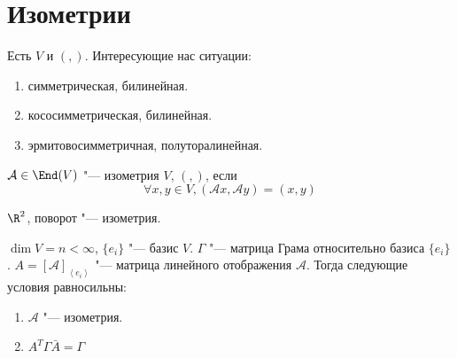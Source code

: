 \section{Изометрии}
Есть $V$ и $(,)$.
Интересующие нас ситуации:
\begin{enumerate}
    \item симметрическая, билинейная.
    \item кососимметрическая, билинейная.
    \item эрмитовосимметричная, полуторалинейная.
\end{enumerate}

\begin{Def}
	$\mathcal A \in \End(V)$ "--- изометрия $V$, $(,)$, если
	\[ \forall x, y \in V, (\mathcal A x, \mathcal A y) = (x, y) \]
\end{Def}

\begin{exmp}
	$\R^2$, поворот "--- изометрия.
\end{exmp}

\begin{theorem}
	$\dim V = n < \infty$, $\{e_i\} $ "--- базис $V$.
	$\Gamma$ "--- матрица Грама относительно базиса $\{e_i\}$.
	$A = [\mathcal A]_{\left<e_i\right>}$ "--- матрица линейного отображения $\mathcal A$.
	Тогда следующие условия равносильны:
	\begin{enumerate}
		\item $\mathcal A $ "--- изометрия.
		\item $A^T \Gamma \bar A = \Gamma$
	\end{enumerate}
\end{theorem}

